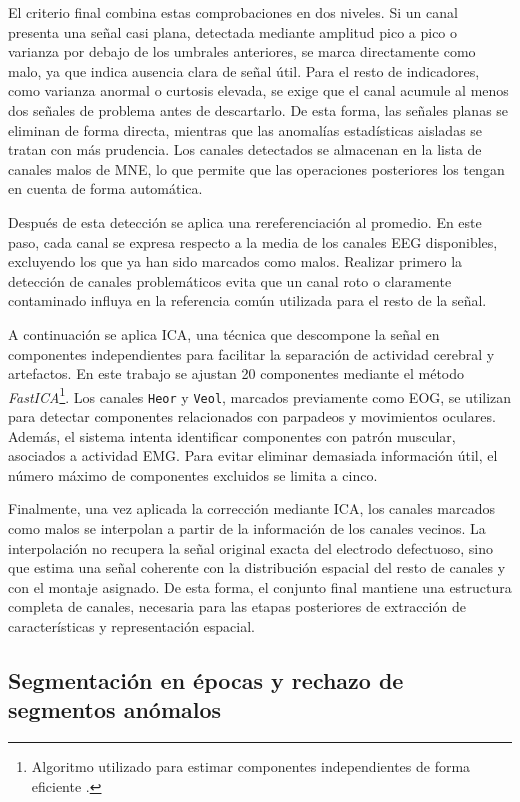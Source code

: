 El criterio final combina estas comprobaciones en dos niveles. Si un canal presenta una señal casi plana, detectada mediante amplitud pico a pico o varianza por debajo de los umbrales anteriores, se marca directamente como malo, ya que indica ausencia clara de señal útil. Para el resto de indicadores, como varianza anormal o curtosis elevada, se exige que el canal acumule al menos dos señales de problema antes de descartarlo. De esta forma, las señales planas se eliminan de forma directa, mientras que las anomalías estadísticas aisladas se tratan con más prudencia. Los canales detectados se almacenan en la lista de canales malos de MNE, lo que permite que las operaciones posteriores los tengan en cuenta de forma automática.

Después de esta detección se aplica una rereferenciación al promedio. En este paso, cada canal se expresa respecto a la media de los canales \ac{EEG} disponibles, excluyendo los que ya han sido marcados como malos. Realizar primero la detección de canales problemáticos evita que un canal roto o claramente contaminado influya en la referencia común utilizada para el resto de la señal.

A continuación se aplica \ac{ICA}, una técnica que descompone la señal en componentes independientes para facilitar la separación de actividad cerebral y artefactos. En este trabajo se ajustan 20 componentes mediante el método \textit{FastICA}\footnote{Algoritmo utilizado para estimar componentes independientes de forma eficiente \cite{wikipediaFastICA}.}. Los canales \texttt{Heor} y \texttt{Veol}, marcados previamente como \ac{EOG}, se utilizan para detectar componentes relacionados con parpadeos y movimientos oculares. Además, el sistema intenta identificar componentes con patrón muscular, asociados a actividad \ac{EMG}. Para evitar eliminar demasiada información útil, el número máximo de componentes excluidos se limita a cinco.

Finalmente, una vez aplicada la corrección mediante \ac{ICA}, los canales marcados como malos se interpolan a partir de la información de los canales vecinos. La interpolación no recupera la señal original exacta del electrodo defectuoso, sino que estima una señal coherente con la distribución espacial del resto de canales y con el montaje asignado. De esta forma, el conjunto final mantiene una estructura completa de canales, necesaria para las etapas posteriores de extracción de características y representación espacial.

\subsection{Segmentación en épocas y rechazo de segmentos anómalos}

